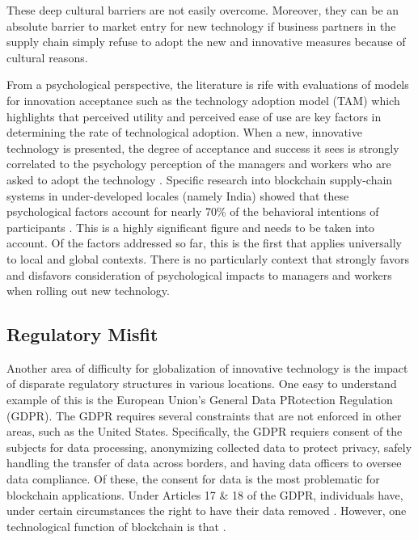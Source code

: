 These deep cultural barriers are not easily overcome. Moreover, they can be an absolute barrier to market entry for new technology if business partners in the supply chain simply refuse to adopt the new and innovative measures because of cultural reasons.

From a psychological perspective, the literature is rife with evaluations of models for innovation acceptance such as the technology adoption model (TAM) which highlights that perceived utility and perceived ease of use are key factors in determining the rate of technological adoption. When a new, innovative technology is presented, the degree of acceptance and success it sees is strongly correlated to the psychology perception of the managers and workers who are asked to adopt the technology \parencite{gefenTrustTAMOnline2003}. Specific research into blockchain supply-chain systems in under-developed locales (namely India) showed that these psychological factors account for nearly 70\% of the behavioral intentions of participants \parencite{kambleUnderstandingBlockchainTechnology2019}. This is a highly significant figure and needs to be taken into account. Of the factors addressed so far, this is the first that applies universally to local and global contexts. There is no particularly context that strongly favors and disfavors consideration of psychological impacts to managers and workers when rolling out new technology.

\subsection{Regulatory Misfit}

Another area of difficulty for globalization of innovative technology is the impact of disparate regulatory structures in various locations. One easy to understand example of this is the European Union's General Data PRotection Regulation (GDPR). The GDPR requires several constraints that are not enforced in other areas, such as the United States. Specifically, the GDPR requiers consent of the subjects for data processing, anonymizing collected data to protect privacy, safely handling the transfer of data across borders, and having data officers to oversee data compliance. Of these, the consent for data is the most problematic for blockchain applications. Under Articles 17 \& 18 of the GDPR, individuals have, under certain circumstances the right to have their data removed \parencite{Art17GDPR}. However, one technological function of blockchain is that .

